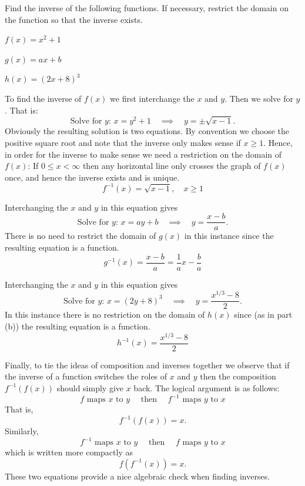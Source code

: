 \bex
Find the inverse of the following functions.  If necessary, restrict the domain on the
function so that the inverse exists.
\ba
    \item $f(x) = x^2+1$
    \item $g(x) = ax+b$
    \item $h(x) = (2x+8)^3$
\ea
\eex
\ba
    \item To find the inverse of $f(x)$ we first interchange the $x$ and $y$.  Then we
        solve for $y$.  That is:
        \[ \text{Solve for $y$: } x = y^2+1 \quad \implies \quad y = \pm\sqrt{x-1}. \]
        Obviously the resulting solution is two equations.  By convention we choose the
        positive square root and note that the inverse only makes sense if $x\ge 1$.
        Hence, in order for the inverse to make sense we need a restriction on the domain
        of $f(x)$: If $0 \le x < \infty$ then any horizontal line only crosses the  graph
        of $f(x)$ once, and hence the inverse exists and is unique.
        \[ f^{-1}(x) = \sqrt{x-1}, \quad x \ge 1 \]
    \item Interchanging the $x$ and $y$ in this equation gives
        \[ \text{Solve for $y$: } x = ay+b \quad \implies \quad y = \frac{x-b}{a}. \]
        There is no need to restrict the domain of $g(x)$ in this instance since the
        resulting equation is a function.
        \[ g^{-1}(x) = \frac{x-b}{a} = \frac{1}{a} x - \frac{b}{a} \]
    \item Interchanging the $x$ and $y$ in this equation gives
        \[ \text{Solve for $y$: } x = (2y+8)^3 \quad \implies \quad y = \frac{x^{1/3}-8}{2}. \]
        In this instance there is no restriction on the domain of $h(x)$ since (as in part
        (b)) the resulting equation is a function.
        \[ h^{-1}(x) = \frac{x^{1/3}-8}{2} \]
\ea
\afterex

Finally, to tie the ideas of composition and inverses together we observe that if the
inverse of a function switches the roles of $x$ and $y$ then the composition
$f^{-1}(f(x))$ should simply give $x$ back.  The logical argument is as follows: 
\[ f \text{ maps } x \text{ to } y \quad \text{ then } \quad f^{-1} \text{ maps } y \text{ to }
    x \]
That is,
\[ f^{-1}(f(x)) = x. \]
Similarly, 
\[ f^{-1} \text{ maps } x \text{ to } y \quad \text{ then } \quad f \text{ maps } y \text{ to }
    x \]
which is written more compactly as
\[ f(f^{-1}(x)) = x. \]
These two equations provide a nice algebraic check when finding inverses.




